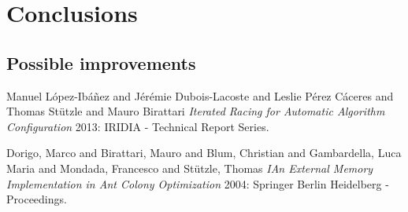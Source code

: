 \documentclass[12pt]{article}
\begin{document}
\section{Conclusions}


\subsection{Possible improvements}



\begin{thebibliography}{1}


 Manuel L{\'o}pez-Ib{\'a}{\~n}ez  and  J{\'e}r{\'e}mie Dubois-Lacoste  and Leslie {P{\'e}rez C{\'a}ceres}  and  Thomas St{\"u}tzle  and  Mauro Birattari {\em Iterated Racing for Automatic Algorithm Configuration} 2013: IRIDIA - Technical Report Series.
  
 Dorigo, Marco
and Birattari, Mauro
and Blum, Christian
and Gambardella, Luca Maria
and Mondada, Francesco
and St{\"u}tzle, Thomas {\em IAn External Memory Implementation in Ant Colony Optimization} 2004: Springer Berlin Heidelberg - Proceedings.

\end{thebibliography}
\end{document}
